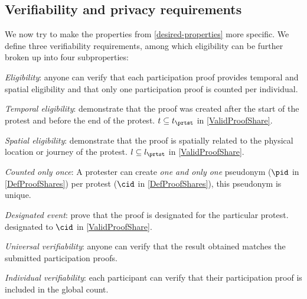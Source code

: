 \subsection{Verifiability and privacy requirements}%
\label{verifiability-properties}

We now try to make the properties from \cref{desired-properties} more 
specific.
We define three verifiability requirements, among which eligibility can be 
further broken up into four subproperties:
\begin{requirements}[V]
  \item\label{EligibilityVerif} \emph{Eligibility}: anyone can verify that each participation proof provides temporal and spatial eligibility and that only one participation proof is counted per individual.
    \begin{requirements}

    \item\label{TemporallyRelated} \emph{Temporal eligibility}: demonstrate that the proof was created after the start of the protest and before the end of the protest.
      \Ie \(t\subseteq t_{\prtst}\) in \cref{ValidProofShare}.

    \item\label{SpatiallyRelated} \emph{Spatial eligibility}: demonstrate that the proof is spatially related to the physical location or journey of the protest.
      \Ie \(l\subseteq l_{\prtst}\) in \cref{ValidProofShare}.

    \item\label{CountOnce} \emph{Counted only once}:
      A protester can create \emph{one and only one} pseudonym (\(\pid\) in 
      \cref{DefProofShares}) per protest (\(\cid\) in \cref{DefProofShares}), 
      this pseudonym is unique.

    \item\label{DesignatedEvent} \emph{Designated event}: prove that the proof 
      is designated for the particular protest.
      \Ie designated to \(\cid\) in \cref{ValidProofShare}.

    \end{requirements}

  \item\label{UniversalVerif} \emph{Universal verifiability}: anyone can verify that the result obtained matches the submitted participation proofs.

  \item\label{IndividualVerif} \emph{Individual verifiability}: each participant can verify that their participation proof is included in the global count.
\end{requirements}

